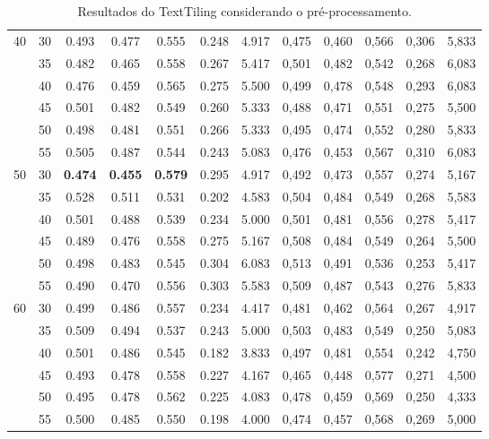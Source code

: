\begin{table}[!h]
\begin{tabular}{|c|c||c|c|c|c|c||c|c|c|c|c|}
 \multirow{6}{*}{40} 
  & 30 & 0.493 & 0.477 & 0.555 & 0.248  & 4.917                & 0,475 & 0,460 & 0,566 & 0,306 & 5,833  \\ \cline{2-12} 
  & 35 & 0.482 & 0.465 & 0.558 & 0.267  & 5.417                & 0,501 & 0,482 & 0,542 & 0,268 & 6,083  \\ \cline{2-12} 
  & 40 & 0.476 & 0.459 & 0.565 & 0.275  & 5.500                & 0,499 & 0,478 & 0,548 & 0,293 & 6,083  \\ \cline{2-12} 
  & 45 & 0.501 & 0.482 & 0.549 & 0.260  & 5.333                & 0,488 & 0,471 & 0,551 & 0,275 & 5,500  \\ \cline{2-12} 
  & 50 & 0.498 & 0.481 & 0.551 & 0.266  & 5.333                & 0,495 & 0,474 & 0,552 & 0,280 & 5,833  \\ \cline{2-12} 
  & 55 & 0.505 & 0.487 & 0.544 & 0.243  & 5.083                & 0,476 & 0,453 & 0,567 & 0,310 & 6,083  \\ \hline      
 \multirow{6}{*}{50} 
 & 30 & \cellcolor{gray!20} \textbf{0.474} & \cellcolor{gray!20} \textbf{0.455} & \cellcolor{gray!20} \textbf{0.579} & 0.295 & 4.917 & 0,492 & 0,473 & 0,557 & 0,274 & 5,167  \\ \cline{2-12}
  & 35 & 0.528 & 0.511 & 0.531 & 0.202  & 4.583                & 0,504 & 0,484 & 0,549 & 0,268 & 5,583  \\ \cline{2-12} 
  & 40 & 0.501 & 0.488 & 0.539 & 0.234  & 5.000                & 0,501 & 0,481 & 0,556 & 0,278 & 5,417  \\ \cline{2-12} 
  & 45 & 0.489 & 0.476 & 0.558 & 0.275  & 5.167                & 0,508 & 0,484 & 0,549 & 0,264 & 5,500  \\ \cline{2-12} 
  & 50 & 0.498 & 0.483 & 0.545 & 0.304  & 6.083                & 0,513 & 0,491 & 0,536 & 0,253 & 5,417  \\ \cline{2-12} 
  & 55 & 0.490 & 0.470 & 0.556 & 0.303  & 5.583                & 0,509 & 0,487 & 0,543 & 0,276 & 5,833  \\ \hline      
 \multirow{6}{*}{60}                           
  & 30 & 0.499 & 0.486 & 0.557 & 0.234  & 4.417                & 0,481 & 0,462 & 0,564 & 0,267 & 4,917  \\ \cline{2-12} 
  & 35 & 0.509 & 0.494 & 0.537 & 0.243  & 5.000                & 0,503 & 0,483 & 0,549 & 0,250 & 5,083  \\ \cline{2-12} 
  & 40 & 0.501 & 0.486 & 0.545 & 0.182  & 3.833                & 0,497 & 0,481 & 0,554 & 0,242 & 4,750  \\ \cline{2-12} 
  & 45 & 0.493 & 0.478 & 0.558 & 0.227  & 4.167                & 0,465 & 0,448 & 0,577 & 0,271 & 4,500  \\ \cline{2-12} 
  & 50 & 0.495 & 0.478 & 0.562 & 0.225  & 4.083                & 0,478 & 0,459 & 0,569 & 0,250 & 4,333  \\ \cline{2-12} 
  & 55 & 0.500 & 0.485 & 0.550 & 0.198  & 4.000                & 0,474 & 0,457 & 0,568 & 0,269 & 5,000  \\ \hline      

 \end{tabular}  
\caption{Resultados do TextTiling considerando o pré-processamento.}
\end{table} 


